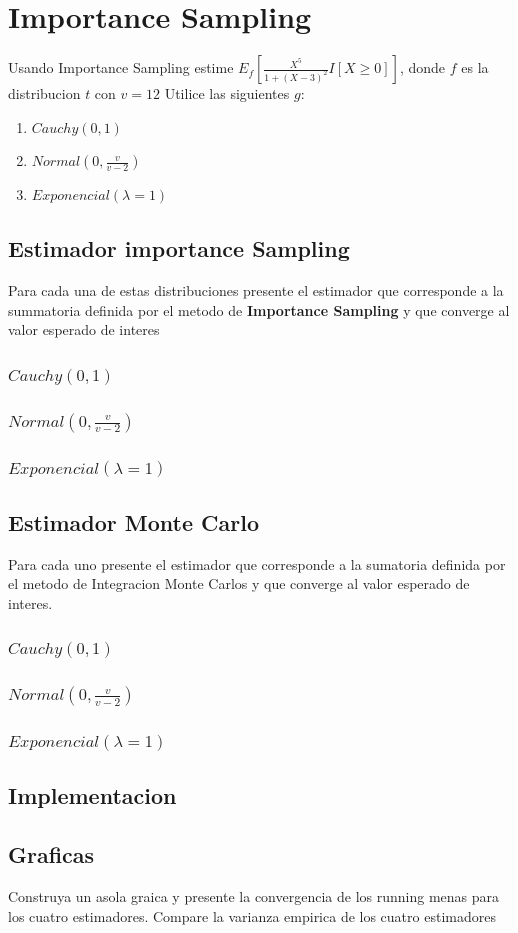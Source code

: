 \documentclass{article}
\begin{document}
\section{Importance Sampling}



Usando Importance Sampling estime $E_f\left[ \frac{X^5}{1+(X - 3)^2}I[X \ge 0] \right]$, donde $f$ es la
distribucion $t$ con $v=12$ Utilice las siguientes $g$:
\begin{enumerate}
	\item $Cauchy(0,1)$
	\item $Normal(0, \frac{v}{v-2})$
	\item $Exponencial(\lambda=1)$
\end{enumerate}

\subsection{Estimador importance Sampling}
Para cada una de estas distribuciones presente el estimador que corresponde a la summatoria definida
por el metodo de \textbf{Importance Sampling} y que converge al valor esperado de interes
\subsubsection{$Cauchy(0,1)$}
\subsubsection{$Normal(0, \frac{v}{v-2})$}
\subsubsection{$Exponencial(\lambda=1)$}

\subsection{Estimador Monte Carlo}
Para cada uno presente el estimador que corresponde a la sumatoria definida por el metodo de Integracion
Monte Carlos y que converge al valor esperado de interes.
\subsubsection{$Cauchy(0,1)$}
\subsubsection{$Normal(0, \frac{v}{v-2})$}
\subsubsection{$Exponencial(\lambda=1)$}

\subsection{Implementacion}

\subsection{Graficas}
Construya un asola graica y presente la convergencia de los running menas para los cuatro estimadores. Compare la varianza empirica de los
cuatro estimadores
\end{document}
